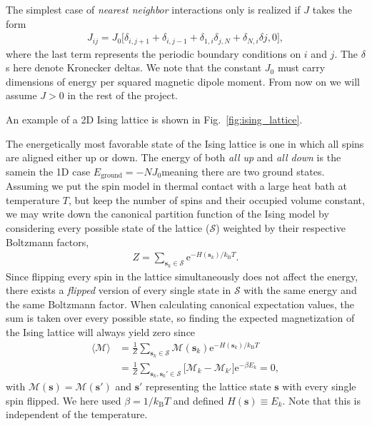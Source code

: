 \documentclass[a4paper, twocolumn]{article}
\newcommand{\fig}[1]{Fig.\ \ref{fig:#1}}
\begin{document}
The simplest case of \textit{nearest neighbor} interactions only is realized if $J$ takes the form
\begin{align}
J_{ij} = J_0\Big[\delta_{i,j+1} + \delta_{i,j-1} + \delta_{1,i}\delta_{j,N} + \delta_{N,i}\delta{j,0}\Big], \nonumber 
\end{align}
where the last term represents the periodic boundary conditions on $i$ and $j$. The $\delta$s here denote Kronecker deltas. We note that the constant $J_0$ must carry dimensions of energy per squared magnetic dipole moment. From now on we will assume $J>0$ in the rest of the project. 

An example of a 2D Ising lattice is shown in \fig{ising_lattice}.

The energetically most favorable state of the Ising lattice is one in which all spins are aligned either up or down. The energy of both \textit{all up} and \textit{all down} is the same\textemdash in the 1D case $E_\text{ground}=-NJ_0$\textemdash meaning there are two ground states. Assuming we put the spin model in thermal contact with a large heat bath at temperature $T$, but keep the number of spins and their occupied volume constant, we may write down the canonical partition function of the Ising model by considering every possible state of the lattice ($\mathcal{S}$) weighted by their respective Boltzmann factors,
\begin{align}
Z=\sum_{\mathbf{s}_k\in\mathcal{S}}\mathrm{e}^{-H(\mathbf{s}_k)/k_\text{B}T}.
\end{align}
Since flipping every spin in the lattice simultaneously does not affect the energy, there exists a \textit{flipped} version of every single state in $\mathcal{S}$ with the same energy and the same Boltzmann factor. When calculating canonical expectation values, the sum is taken over every possible state, so finding the expected magnetization of the Ising lattice will always yield zero since
\begin{align}
\langle \mathcal{M}\rangle &= \frac{1}{Z}\sum_{\mathbf{s}_k\in\mathcal{S}}\mathcal{M}(\mathbf{s}_k)\mathrm{e}^{-H(\mathbf{s}_k)/k_\text{B}T} \nonumber \\
%
&= \frac{1}{Z}\sum_{\mathbf{s}_k,\mathbf{s}_k'\in\mathcal{S}}\Big[\mathcal{M}_k-\mathcal{M}_{k'}\Big]\mathrm{e}^{-\beta E_k} = 0, \nonumber 
\end{align}
with $\mathcal{M}(\mathbf{s})=\mathcal{M}(\mathbf{s}')$ and $\mathbf{s}'$ representing the lattice state $\mathbf{s}$ with every single spin flipped. We here used $\beta=1/k_\text{B}T$ and defined $H(\mathbf{s})\equiv E_k$. Note that this is independent of the temperature.
\end{document}
